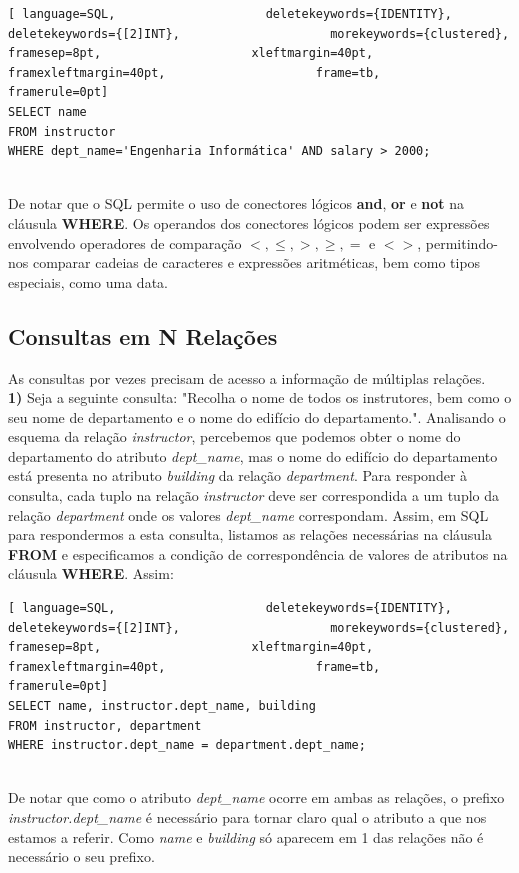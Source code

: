 \documentclass[titlepage]{book}
\theoremstyle{definition}
\begin{document}
\begin{lstlisting}[ language=SQL,                     deletekeywords={IDENTITY},                     deletekeywords={[2]INT},                     morekeywords={clustered},                     framesep=8pt,                     xleftmargin=40pt,                     framexleftmargin=40pt,                     frame=tb,                     framerule=0pt]
SELECT name
FROM instructor
WHERE dept_name='Engenharia Informática' AND salary > 2000;
\end{lstlisting} \\
De notar que o SQL permite o uso de conectores lógicos \textbf{and}, \textbf{or} e \textbf{not} na cláusula \textbf{WHERE}. Os operandos dos conectores lógicos podem ser expressões envolvendo operadores de comparação $<, \leq, >, \geq, =$ e $<>$, permitindo-nos comparar cadeias de caracteres e expressões aritméticas, bem como tipos especiais, como uma data.

\subsection{Consultas em N Relações}
As consultas por vezes precisam de acesso a informação de múltiplas relações. \\
\textbf{1)} Seja a seguinte consulta: "Recolha o nome de todos os instrutores, bem como o seu nome de departamento e o nome do edifício do departamento.". Analisando o esquema da relação \textit{instructor}, percebemos que podemos obter o nome do departamento do atributo \textit{dept\_name}, mas o nome do edifício do departamento está presenta no atributo \textit{building} da relação \textit{department}. Para responder à consulta, cada tuplo na relação \textit{instructor} deve ser correspondida a um tuplo da relação \textit{department} onde os valores \textit{dept\_name} correspondam. Assim, em SQL para respondermos a esta consulta, listamos as relações necessárias na cláusula \textbf{FROM} e especificamos a condição de correspondência de valores de atributos na cláusula \textbf{WHERE}. Assim:

\begin{lstlisting}[ language=SQL,                     deletekeywords={IDENTITY},                     deletekeywords={[2]INT},                     morekeywords={clustered},                     framesep=8pt,                     xleftmargin=40pt,                     framexleftmargin=40pt,                     frame=tb,                     framerule=0pt]
SELECT name, instructor.dept_name, building
FROM instructor, department
WHERE instructor.dept_name = department.dept_name;
\end{lstlisting} \\
De notar que como o atributo \textit{dept\_name} ocorre em ambas as relações, o prefixo \textit{instructor.dept\_name} é necessário para tornar claro qual o atributo a que nos estamos a referir. Como \textit{name} e \textit{building} só aparecem em 1 das relações não é necessário o seu prefixo.
\end{document}

